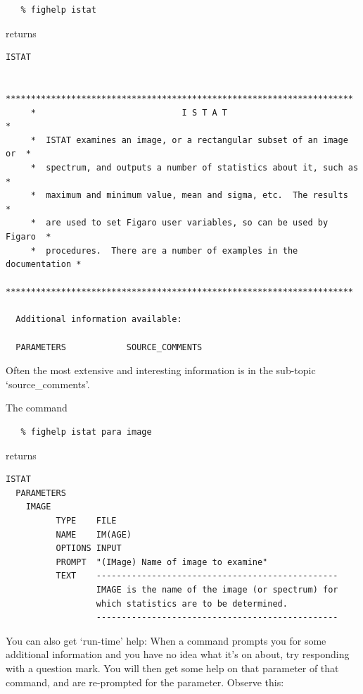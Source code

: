 \documentclass[11pt,twoside]{article}
\begin{document}
\begin{verbatim}
   % fighelp istat
\end{verbatim}

   returns

{\samepage
\begin{verbatim}
ISTAT

     *********************************************************************
     *                             I S T A T                             *
     *  ISTAT examines an image, or a rectangular subset of an image or  *
     *  spectrum, and outputs a number of statistics about it, such as   *
     *  maximum and minimum value, mean and sigma, etc.  The results     *
     *  are used to set Figaro user variables, so can be used by Figaro  *
     *  procedures.  There are a number of examples in the documentation *
     *********************************************************************

  Additional information available:

  PARAMETERS            SOURCE_COMMENTS
\end{verbatim}
}

   Often the most extensive and interesting information is in the
   sub-topic `source\_comments'.

   The command

\begin{verbatim}
   % fighelp istat para image
\end{verbatim}

   returns

\begin{verbatim}
ISTAT
  PARAMETERS
    IMAGE
          TYPE    FILE
          NAME    IM(AGE)
          OPTIONS INPUT
          PROMPT  "(IMage) Name of image to examine"
          TEXT    ------------------------------------------------
                  IMAGE is the name of the image (or spectrum) for
                  which statistics are to be determined.
                  ------------------------------------------------
\end{verbatim}

   You can also get `run-time' help: When a command prompts you for
   some additional information and you have no idea what it's on about,
   try responding with a question mark. You will then get some help on
   that parameter of that command, and are re-prompted for the
   parameter. Observe this:
\end{document}
